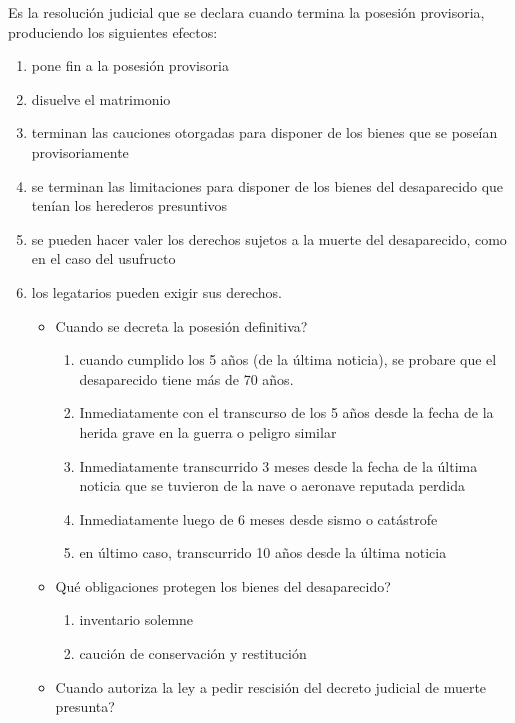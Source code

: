 \documentclass[]{article}
\providecommand{\tightlist}{%
  \setlength{\itemsep}{0pt}\setlength{\parskip}{0pt}}
\begin{document}
\begin{itemize}
\begin{itemize}
    Es la resolución judicial que se declara cuando termina la posesión
    provisoria, produciendo los siguientes efectos:

    \begin{enumerate}
    \def\labelenumi{\arabic{enumi}.}
    \item
      pone fin a la posesión provisoria
    \item
      disuelve el matrimonio
    \item
      terminan las cauciones otorgadas para disponer de los bienes que
      se poseían provisoriamente
    \item
      se terminan las limitaciones para disponer de los bienes del
      desaparecido que tenían los herederos presuntivos
    \item
      se pueden hacer valer los derechos sujetos a la muerte del
      desaparecido, como en el caso del usufructo
    \item
      los legatarios pueden exigir sus derechos.

      \begin{itemize}
      \tightlist
      \item
        Cuando se decreta la posesión definitiva?

        \begin{enumerate}
        \def\labelenumii{\arabic{enumii}.}
        \tightlist
        \item
          cuando cumplido los 5 años (de la última noticia), se probare
          que el desaparecido tiene más de 70 años.
        \item
          Inmediatamente con el transcurso de los 5 años desde la fecha
          de la herida grave en la guerra o peligro similar
        \item
          Inmediatamente transcurrido 3 meses desde la fecha de la
          última noticia que se tuvieron de la nave o aeronave reputada
          perdida
        \item
          Inmediatamente luego de 6 meses desde sismo o catástrofe
        \item
          en último caso, transcurrido 10 años desde la última noticia
        \end{enumerate}
      \item
        Qué obligaciones protegen los bienes del desaparecido?

        \begin{enumerate}
        \def\labelenumii{\arabic{enumii}.}
        \tightlist
        \item
          inventario solemne
        \item
          caución de conservación y restitución
        \end{enumerate}
      \item
        Cuando autoriza la ley a pedir rescisión del decreto judicial de
        muerte presunta?


\end{itemize}
\end{enumerate}
\end{itemize}
\end{itemize}
\end{document}
